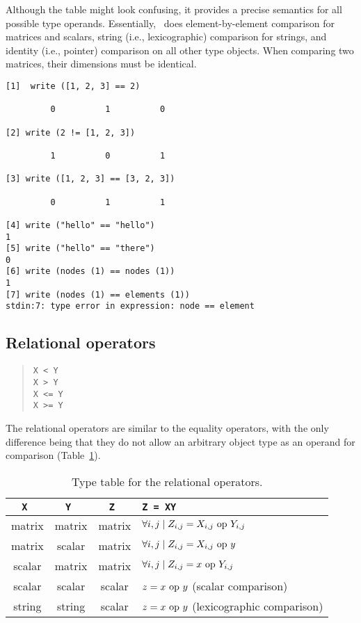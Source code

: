 Although the table might look confusing, it provides a precise
semantics for all possible type operands.  Essentially, \burlap\ does
element-by-element comparison for matrices and scalars, string (i.e.,
lexicographic) comparison for strings, and identity (i.e., pointer)
comparison on all other type objects.  When comparing two matrices,
their dimensions must be identical.

\begin{screen}
\begin{verbatim}
[1]  write ([1, 2, 3] == 2)

         0          1          0 

[2] write (2 != [1, 2, 3])

         1          0          1 

[3] write ([1, 2, 3] == [3, 2, 3])

         0          1          1 

[4] write ("hello" == "hello")
1
[5] write ("hello" == "there")
0
[6] write (nodes (1) == nodes (1))
1
[7] write (nodes (1) == elements (1))
stdin:7: type error in expression: node == element
\end{verbatim}
\end{screen}


\subsection{Relational operators}
\label{burlap.op.relational}

\begin{quote}
\begin{verbatim}
X < Y
X > Y
X <= Y
X >= Y
\end{verbatim}
\end{quote}

The relational operators are similar to the equality operators, with
the only difference being that they do not allow an arbitrary object
type as an operand for comparison
(Table~\ref{burlap.relational.types}).

\begin{table}[htbp]
\begin{center}
\begin{tabular}{c|c|c|l}
\tt X  & \tt Y	& \tt Z	 & \tt Z = X\op Y				    \\
\hline
matrix & matrix	& matrix & $\forall i,j \mid Z_{i,j} = X_{i,j} \mbox{\rm\ op } Y_{i,j}$ \\
matrix & scalar	& matrix & $\forall i,j \mid Z_{i,j} = X_{i,j} \mbox{\rm\ op } y$	    \\
scalar & matrix	& matrix & $\forall i,j \mid Z_{i,j} = x \mbox{\rm\ op } Y_{i,j}$	    \\
scalar & scalar & scalar & $z = x \mbox{\rm\ op } y$ (scalar comparison)		    \\
string & string & scalar & $z = x \mbox{\rm\ op } y$ (lexicographic comparison)	    \\
\end{tabular}
\caption{Type table for the relational operators.}
\label{burlap.relational.types}
\end{center}
\end{table}

